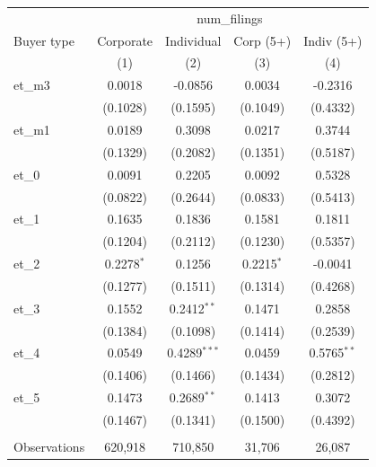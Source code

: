 
\begingroup
\centering
\begin{tabular}{lcccc}
   \toprule
    & \multicolumn{4}{c}{num\_filings}\\
   Buyer type          & Corporate     & Individual     & Corp (5+)     & Indiv (5+) \\   
                       & (1)           & (2)            & (3)           & (4)\\  
   \midrule 
   et\_m3              & 0.0018        & -0.0856        & 0.0034        & -0.2316\\   
                       & (0.1028)      & (0.1595)       & (0.1049)      & (0.4332)\\   
   et\_m1              & 0.0189        & 0.3098         & 0.0217        & 0.3744\\   
                       & (0.1329)      & (0.2082)       & (0.1351)      & (0.5187)\\   
   et\_0               & 0.0091        & 0.2205         & 0.0092        & 0.5328\\   
                       & (0.0822)      & (0.2644)       & (0.0833)      & (0.5413)\\   
   et\_1               & 0.1635        & 0.1836         & 0.1581        & 0.1811\\   
                       & (0.1204)      & (0.2112)       & (0.1230)      & (0.5357)\\   
   et\_2               & 0.2278$^{*}$  & 0.1256         & 0.2215$^{*}$  & -0.0041\\   
                       & (0.1277)      & (0.1511)       & (0.1314)      & (0.4268)\\   
   et\_3               & 0.1552        & 0.2412$^{**}$  & 0.1471        & 0.2858\\   
                       & (0.1384)      & (0.1098)       & (0.1414)      & (0.2539)\\   
   et\_4               & 0.0549        & 0.4289$^{***}$ & 0.0459        & 0.5765$^{**}$\\   
                       & (0.1406)      & (0.1466)       & (0.1434)      & (0.2812)\\   
   et\_5               & 0.1473        & 0.2689$^{**}$  & 0.1413        & 0.3072\\   
                       & (0.1467)      & (0.1341)       & (0.1500)      & (0.4392)\\   
    \\
   Observations        & 620,918       & 710,850        & 31,706        & 26,087\\  

\end{tabular}
